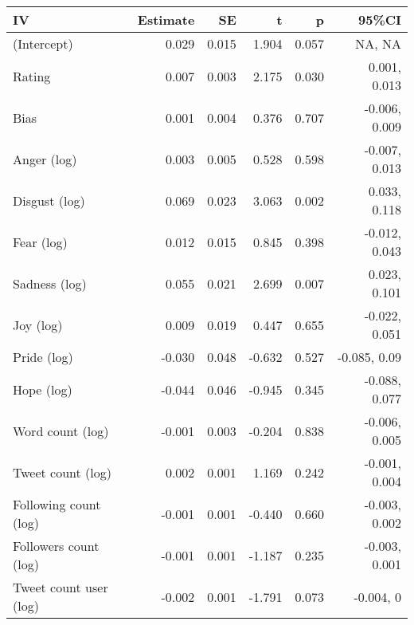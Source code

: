 
\begin{tabular}{lrrrrr}
\toprule
IV & Estimate & SE & t & p & 95\%CI\\
\midrule
(Intercept) & 0.029 & 0.015 & 1.904 & 0.057 & NA, NA\\
Rating & 0.007 & 0.003 & 2.175 & 0.030 & 0.001, 0.013\\
Bias & 0.001 & 0.004 & 0.376 & 0.707 & -0.006, 0.009\\
Anger (log) & 0.003 & 0.005 & 0.528 & 0.598 & -0.007, 0.013\\
Disgust (log) & 0.069 & 0.023 & 3.063 & 0.002 & 0.033, 0.118\\
Fear (log) & 0.012 & 0.015 & 0.845 & 0.398 & -0.012, 0.043\\
Sadness (log) & 0.055 & 0.021 & 2.699 & 0.007 & 0.023, 0.101\\
Joy (log) & 0.009 & 0.019 & 0.447 & 0.655 & -0.022, 0.051\\
Pride (log) & -0.030 & 0.048 & -0.632 & 0.527 & -0.085, 0.09\\
Hope (log) & -0.044 & 0.046 & -0.945 & 0.345 & -0.088, 0.077\\
Word count (log) & -0.001 & 0.003 & -0.204 & 0.838 & -0.006, 0.005\\
Tweet count (log) & 0.002 & 0.001 & 1.169 & 0.242 & -0.001, 0.004\\
Following count (log) & -0.001 & 0.001 & -0.440 & 0.660 & -0.003, 0.002\\
Followers count (log) & -0.001 & 0.001 & -1.187 & 0.235 & -0.003, 0.001\\
Tweet count user (log) & -0.002 & 0.001 & -1.791 & 0.073 & -0.004, 0\\
\bottomrule
\end{tabular}
